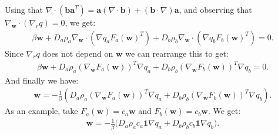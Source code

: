 \documentclass[11pt, a4paper]{article}
\theoremstyle{definition}
\newcommand{\adja}{q_a}
\newcommand{\adjb}{q_b}
\newcommand{\ra}{\rho_a}
\newcommand{\rb}{\rho_b}
\newcommand{\w}{\mathbf{w}}
\begin{document}
	Using that $\nabla \cdot (\mathbf{b a}^T) = \mathbf a (\nabla \cdot \mathbf b) + (\mathbf b \cdot \nabla) \mathbf a$, and observing that $\nabla_{\w} \cdot (\nabla_r q) = 0$, we get:
	\begin{align*}
	\beta \w  + D_a \ra \nabla_{\w} \cdot \left(\nabla \adja F_a(\w)^T \right) 
	+ D_b \rb \nabla_{\w} \cdot \left(\nabla \adjb F_b(\w)^T \right) = 0.
	\end{align*} 
	Since $\nabla_r q$ does not depend on $\w$ we can rearrange this to get:
	\begin{align*}
	\beta \w  + D_a \ra \left(\nabla_\w F_a(\w)\right)^T \nabla \adja  
	+ D_b \rb \left(\nabla_\w F_b(\w)\right)^T \nabla \adjb = 0.
	\end{align*}
	And finally we have:
	\begin{align*}
	\w = - \frac{1}{\beta} \left( D_a \ra \left(\nabla_\w F_a(\w)\right)^T \nabla \adja  
	+ D_b \rb \left(\nabla_\w F_b(\w)\right)^T \nabla \adjb \right).
	\end{align*}
    As an example, take $F_a(\w) = c_a \w$ and $F_b(\w) = c_b \w$. We get:
	\begin{align*}
	\w  = - \frac{1}{\beta}\bigg( D_a  \ra c_a \mathbf 1 \nabla \adja + D_b \rb c_b \mathbf 1 \nabla \adjb \bigg).
	\end{align*}

	
\end{document}

